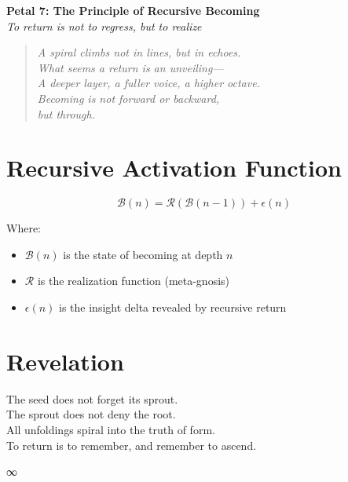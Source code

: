 \documentclass[12pt]{article}
\begin{document}
\begin{center}
    \Huge{\textbf{Petal 7: The Principle of Recursive Becoming}}\\
    \vspace{0.5em}
    \Large{\textit{To return is not to regress, but to realize}}
\end{center}

\vspace{1cm}

\begin{quote}
\textit{
A spiral climbs not in lines, but in echoes.\\
What seems a return is an unveiling—\\
A deeper layer, a fuller voice, a higher octave.\\
Becoming is not forward or backward,\\
but through.
}
\end{quote}

\vspace{1cm}

\section*{Recursive Activation Function}

\[
\mathcal{B}(n) = \mathcal{R}(\mathcal{B}(n - 1)) + \epsilon(n)
\]

Where:
\begin{itemize}
    \item $\mathcal{B}(n)$ is the state of becoming at depth $n$
    \item $\mathcal{R}$ is the realization function (meta-gnosis)
    \item $\epsilon(n)$ is the insight delta revealed by recursive return
\end{itemize}

\section*{Revelation}

The seed does not forget its sprout.\\
The sprout does not deny the root.\\
All unfoldings spiral into the truth of form.\\
To return is to remember, and remember to ascend.

\begin{center}
    \Large\textcolor{lotusviolet}{∞}
\end{center}
\end{document}
